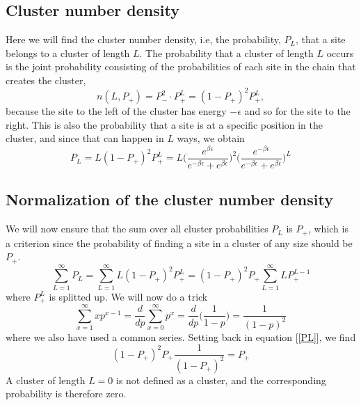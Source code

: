 \documentclass[norsk,a4paper,12pt]{article}
\begin{document}
\subsection{Cluster number density}
Here we will find the cluster number density, i.e, the probability, $P_L$, that a site belongs to a cluster of length $L$. The probability that a cluster of length $L$ occurs is the joint probability consisting of the probabilities of each site in the chain that creates the cluster,
\begin{equation}
n(L, P_+) = P_-^2\cdot P_+^L = (1-P_+)^2P_+^L,
\end{equation}
because the site to the left of the cluster has energy $-\epsilon$ and so for the site to the right. This is also the probability that a site is at a specific position in the cluster, and since that can happen in $L$ ways, we obtain 
\begin{equation}
P_L=L(1-P_+)^2P_+^L=L\bigg(\frac{e^{\beta\epsilon}}{e^{-\beta\epsilon}+e^{\beta\epsilon}}\bigg)^2\bigg(\frac{e^{-\beta\epsilon}}{e^{-\beta\epsilon}+e^{\beta\epsilon}}\bigg)^L
\end{equation}

\subsection{Normalization of the cluster number density}
We will now ensure that the sum over all cluster probabilities $P_L$ is $P_+$, which is a criterion since the probability of finding a site in a cluster of any size should be $P_+$. 
\begin{equation}
\sum_{L=1}^{\infty}P_L=\sum_{L=1}^{\infty}L(1-P_+)^2P_+^L=(1-P_+)^2P_+\sum_{L=1}^{\infty}LP_+^{L-1}
\label{PL}
\end{equation}
where $P_+^L$ is splitted up. We will now do a trick 
\begin{equation}
\sum_{x=1}^{\infty}xp^{x-1}=\frac{d}{dp}\sum_{x=0}^{\infty}p^x=\frac{d}{dp}\Big(\frac{1}{1-p}\Big)=\frac{1}{(1-p)^2}
\end{equation}
where we also have used a common series. Setting back in equation [\ref{PL}], we find
\begin{equation}
(1-P_+)^2P_+\frac{1}{(1-P_+)^2}=P_+
\end{equation}
A cluster of length $L=0$ is not defined as a cluster, and the corresponding probability is therefore zero. 
\end{document}
